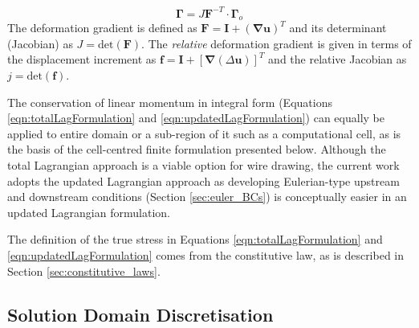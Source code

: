 \documentclass[sn-mathphys,Numbered]{sn-jnl}%
\newcommand{\bb}{\boldsymbol}
\begin{document}
\begin{equation}
    \bb{\Gamma} = J\bb{F}^{-T}\cdot\bb{\Gamma}_o
\end{equation}
The deformation gradient is defined as $\bb{F} = \textbf{I} + (\boldsymbol{\nabla} \boldsymbol{u})^T$ and its determinant (Jacobian) as $J = \text{det}(\boldsymbol{F})$.
The \emph{relative} deformation gradient is given in terms of the displacement increment as $\bb{f}=\textbf{I} + \left[\bb{\nabla}(\Delta \bb{u}) \right]^T$ and the relative Jacobian as $j = \text{det}(\bb{f})$.

The conservation of linear momentum in integral form (Equations \ref{eqn:totalLagFormulation} and \ref{eqn:updatedLagFormulation}) can equally be applied to entire domain or a sub-region of it such as a computational cell, as is the basis of the cell-centred finite formulation presented below.
Although the total Lagrangian approach is a viable option for wire drawing, the current work adopts the updated Lagrangian approach as developing Eulerian-type upstream and downstream conditions (Section \ref{sec:euler_BCs}) is conceptually easier in an updated Lagrangian formulation.

The definition of the true stress in Equations \ref{eqn:totalLagFormulation} and \ref{eqn:updatedLagFormulation} comes from the constitutive law, as is described in Section \ref{sec:constitutive_laws}.


\subsection{Solution Domain Discretisation} \label{sec:solDomDiscret}
\end{document}
